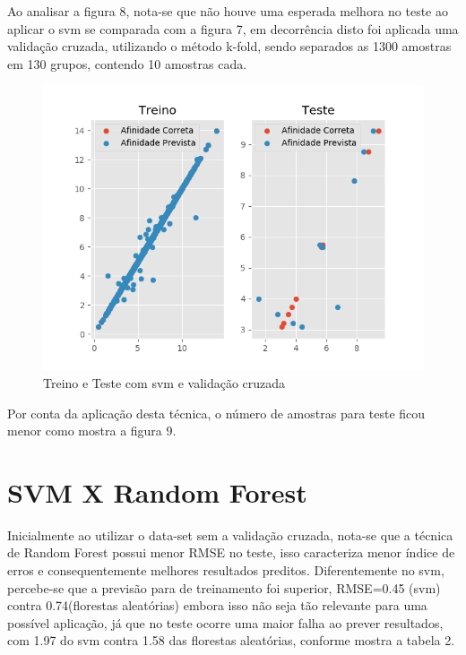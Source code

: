 \documentclass[tcc, capa]{texucpel}
\begin{document}
Ao analisar a figura 8, nota-se que não houve uma esperada melhora no teste ao aplicar o svm se comparada com a figura 7, em decorrência disto foi aplicada uma validação cruzada, utilizando o método k-fold, sendo separados as 1300 amostras em 130 grupos, contendo 10 amostras cada.

    \begin{figure}[!h]
	\centering\includegraphics[width=15cm]{imagens/svmCV.png}
	\caption{Treino e Teste com svm e validação cruzada}
	\end{figure}
    \FloatBarrier
    
Por conta da aplicação desta técnica, o número de amostras para teste ficou menor como mostra a figura 9.    

\section{SVM X Random Forest}
Inicialmente ao utilizar o data-set sem a validação cruzada, nota-se que a técnica de Random Forest possui menor RMSE no teste, isso caracteriza menor índice de erros e consequentemente melhores resultados preditos.
Diferentemente no svm, percebe-se que a previsão para de treinamento foi superior, RMSE=0.45 (svm) contra 0.74(florestas aleatórias) embora isso não seja tão relevante para uma possível aplicação, já que no teste ocorre uma maior falha ao prever resultados, com 1.97 do svm contra 1.58 das florestas aleatórias, conforme mostra a tabela 2.
\end{document}
